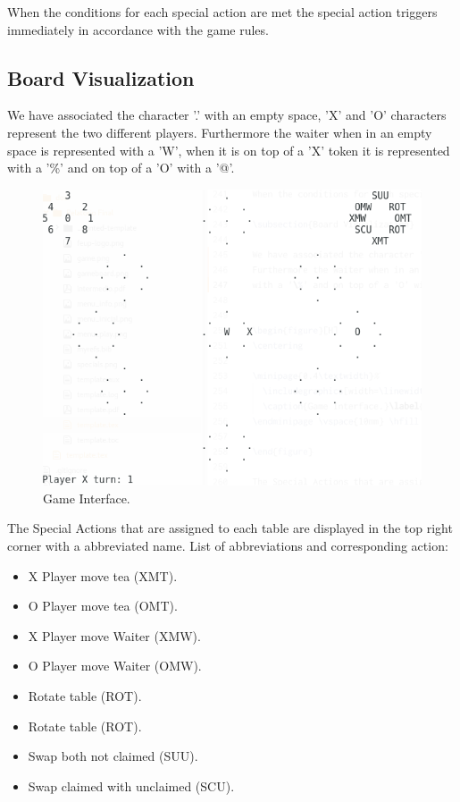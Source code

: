 \documentclass[a4paper]{article}
\begin{document}
When the conditions for each special action are met the special action triggers immediately in accordance with the game rules.

\subsection{Board Visualization}

We have associated the character '.' with an empty space, 'X' and 'O' characters represent the two different players.
Furthermore the waiter when in an empty space is represented with a 'W', when it is on top of a 'X' token it is represented
with a '\%' and on top of a 'O' with a '@'.


\begin{figure}[H]
\centering

%
  \includegraphics[width=\linewidth]{game.png}
  \caption{Game Interface.}\label{fig:game}
\endminipage \vspace{10mm} \hfill

\end{figure}

The Special Actions that are assigned to each table are displayed in the top right corner with a abbreviated name.
List of abbreviations and corresponding action: \vspace{1mm}

 \begin{itemize}
    \item X Player move tea (XMT).
    \item O Player move tea (OMT).
    \item X Player move Waiter (XMW).
    \item O Player move Waiter (OMW).
    \item Rotate table (ROT).
    \item Rotate table (ROT).
    \item Swap both not claimed (SUU).
    \item Swap claimed with unclaimed (SCU).
\end{itemize}
\end{document}
